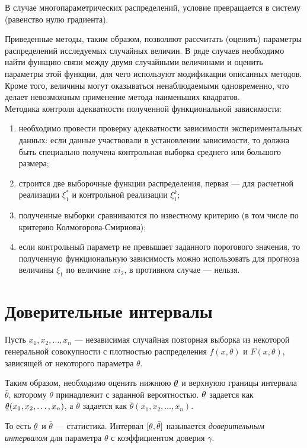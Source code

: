 \documentclass[12pt]{article}
\newcommand{\ubar}[1]{\text{\b{$#1$}}}
\begin{document}
В случае многопараметрических распределений, условие превращается в систему (равенство нулю градиента).

Приведенные методы, таким образом, позволяют рассчитать (оценить) параметры распределений исследуемых случайных величин. В ряде случаев необходимо найти функцию связи между двумя случайными величинами и оценить параметры этой функции, для чего используют модификации описанных методов. Кроме того, величины могут оказываться ненаблюдаемыми одновременно, что делает невозможным применение метода наименьших квадратов.\\

Методика контроля адекватности полученной функциональной зависимости:
\begin{enumerate}
    \item необходимо провести проверку адекватности зависимости экспериментальных данных: если данные участвовали в установлении зависимости, то должна быть специально получена контрольная выборка среднего или большого размера;
    \item строится две выборочные функции распределения, первая --- для расчетной реализации $\xi_1^*$ и контрольной реализации $\xi_1^k$;
    \item полученные выборки сравниваются по известному критерию (в том числе по критерию Колмогорова-Смирнова);
    \item если контрольный параметр не превышает заданного порогового значения, то полученную функциональную зависимость можно использовать для прогноза величины $\xi_1$ по величине $xi_2$, в противном случае --- нельзя.
\end{enumerate}

\newpage
\section{Доверительные интервалы}
Пусть $x_1, x_2, \ldots, x_n$ --- независимая случайная повторная выборка из некоторой генеральной совокупности с плотностью распределения $f(x, \theta)$ и $F(x, \theta)$, зависящей от некоторого параметра $\theta$.

Таким образом, необходимо оценить нижнюю $\ubar{\theta}$ и верхнуюю границы интервала $\bar{\theta}$, которому $\theta$ принадлежит с заданной вероятностью. $\ubar{\theta}$ задается как $\ubar{\theta} (x_1, x_2, \ldots, x_n)$, а $\bar{\theta}$ задается как $\bar{\theta} (x_1, x_2, \ldots, x_n)$.

То есть $\ubar{\theta}$ и $\bar{\theta}$ --- статистика. Интервал $[\ubar{\theta}, \bar{\theta}]$ называется \emph{доверительным интервалом} для параметра $\theta$ с коэффициентом доверия $\gamma$.
\end{document}
